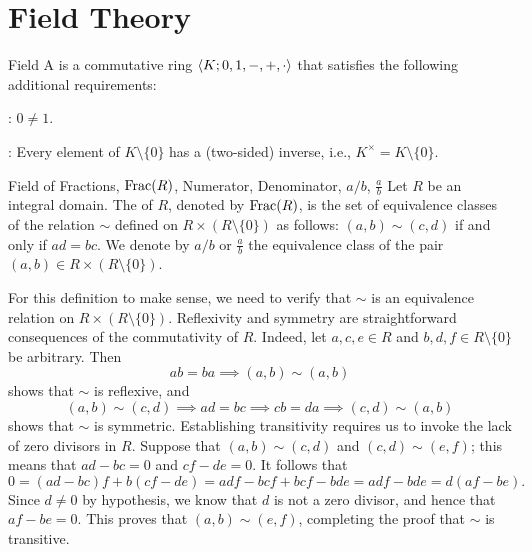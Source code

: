 
\chapter{Field Theory}

\begin{dfnbox}{Field}
	A  is a commutative ring ${\langle {K; 0, 1, -, +, \cdot} \rangle}$ that satisfies the following additional requirements:
	\begin{dfnitems}
		\item {}: $0 \ne 1$.
		\item {}: Every element of $K \setminus \{0\}$ has a (two-sided) inverse, i.e., $K^\times = K \setminus \{0\}$.
	\end{dfnitems}
\end{dfnbox}

\begin{dfnbox}{Field of Fractions, $\operatorname{Frac}(R)$, Numerator, Denominator, $a/b$, $\frac{a}{b}$}
	Let $R$ be an integral domain. The  of $R$, denoted by $\operatorname{Frac}(R)$, is the set of equivalence classes of the relation $\sim$ defined on $R \times (R \setminus \{0\})$ as follows: $(a, b) \sim (c, d)$ if and only if $ad = bc$. We denote by $a/b$ or $\frac{a}{b}$ the equivalence class of the pair $(a, b) \in R \times (R \setminus \{0\})$.
\end{dfnbox}

For this definition to make sense, we need to verify that $\sim$ is an equivalence relation on $R \times (R \setminus \{0\})$. Reflexivity and symmetry are straightforward consequences of the commutativity of $R$. Indeed, let $a, c, e \in R$ and $b, d, f \in R \setminus \{0\}$ be arbitrary. Then
\[ ab = ba \implies (a, b) \sim (a, b) \]
shows that $\sim$ is reflexive, and
\[ (a, b) \sim (c, d) \implies ad = bc \implies cb = da \implies (c, d) \sim (a, b) \]
shows that $\sim$ is symmetric. Establishing transitivity requires us to invoke the lack of zero divisors in $R$. Suppose that $(a, b) \sim (c, d)$ and $(c, d) \sim (e, f)$; this means that $ad - bc = 0$ and $cf - de = 0$. It follows that
\[ 0 = (ad - bc)f + b(cf - de) = adf - bcf + bcf - bde = adf - bde = d(af - be). \]
Since $d \ne 0$ by hypothesis, we know that $d$ is not a zero divisor, and hence that $af - be = 0$. This proves that $(a, b) \sim (e, f)$, completing the proof that $\sim$ is transitive.

